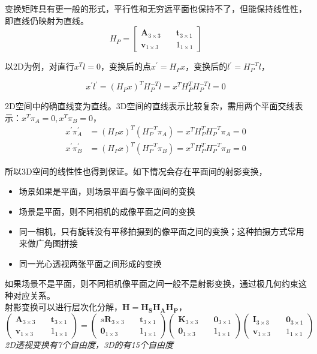 		变换矩阵具有更一般的形式，平行性和无穷远平面也保持不了，但能保持线性性，即直线仍映射为直线。
		$$
			H_P = \begin{bmatrix}
				\mathbf{A}_{3\times 3}\quad& \mathbf{t}_{3\times 1}\\
				\mathbf{v}_{1\times 3} \quad& 1_{1\times 1}
			\end{bmatrix}
		$$

		以2D为例，对直行$x^Tl = 0$，变换后的点$x^\prime = H_Px$，变换后的$l^\prime = H_P^{-T}l$，

		$$
			x^\prime l^\prime = \left(H_Px\right)^TH_P^{-T}l = x^T H_P^TH_P^{-T}l = 0
		$$

		2D空间中的确直线变为直线。3D空间的直线表示比较复杂，需用两个平面交线表示：$x^T\pi_A =0,  x^T\pi_B =0$，
		\begin{align*}		
			x^\prime \pi_A^{\prime} &= (H_Px)^T(H_P^{-T}\pi_A) = x^TH_P^TH_P^{-T}\pi_A = 0\\
			x^\prime \pi_B^{\prime} &= (H_Px)^T(H_P^{-T}\pi_B) = x^TH_P^TH_P^{-T}\pi_B = 0
		\end{align*}

		所以3D空间的线性性也得到保证。如下情况会存在平面间的射影变换，

		\begin{itemize}
			\item 场景如果是平面，则场景平面与像平面间的变换
			\item 场景是平面，则不同相机的成像平面之间的变换
			\item 同一相机，只有旋转没有平移拍摄到的像平面之间的变换；这种拍摄方式常用来做广角图拼接
			\item 同一光心透视两张平面之间形成的变换
		\end{itemize}

		如果场景不是平面，则不同相机像平面之间一般不是射影变换，通过极几何约束这种对应关系。\\

		射影变换可以进行层次化分解，$\mathbf{H} = \mathbf{H_S}\mathbf{H_A}\mathbf{H_P}$，
		$$
			\begin{pmatrix}
				\mathbf{A}_{3\times 3}\quad& \mathbf{t}_{3\times 1}\\
				\mathbf{v}_{1\times 3} \quad& 1_{1\times 1}
			\end{pmatrix}
			=
			\begin{pmatrix}
				s\mathbf{R}_{3\times 3}\quad & \mathbf{t}_{3\times 1}\\
				\mathbf{0}_{1\times 3}\quad & 1_{1\times 1}
			\end{pmatrix}
			\begin{pmatrix}
				\mathbf{K}_{3\times 3}\quad & \mathbf{0}_{3\times 1}\\
				\mathbf{0}_{1\times 3}\quad & 1_{1\times 1}
			\end{pmatrix}
			\begin{pmatrix}
				\mathbf{I}_{3\times 3}\quad & \mathbf{0}_{3\times 1}\\
				\mathbf{v}_{1\times 3}\quad & 1_{1\times 1}
			\end{pmatrix}
		$$
		\textit{2D透视变换有7个自由度，3D的有15个自由度}
